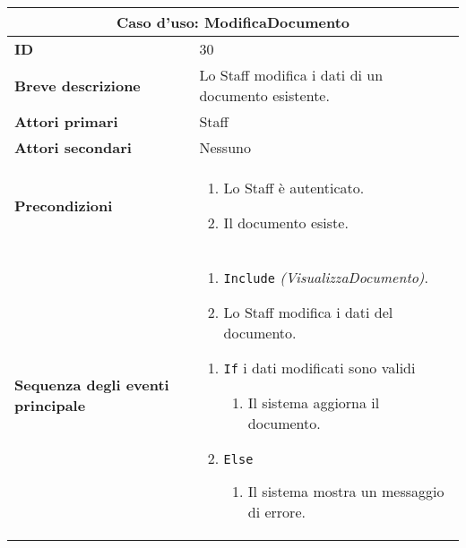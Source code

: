 \documentclass[a4paper]{report}
\begin{document}
\clearpage
\begin{table}[H]
\vspace*{-0cm}
\renewcommand{\arraystretch}{1.9}
\begin{tabular}{|p{3.9cm}|p{9.9cm}|}
\hline
\multicolumn{2}{|c|}{\textbf{Caso d’uso: ModificaDocumento}} \\ \hline
	\textbf{ID} & 30 \\ \hline
	\textbf{Breve descrizione} & Lo Staff modifica i dati di un documento esistente. \\ \hline
	\textbf{Attori primari} & Staff \\ \hline
	\textbf{Attori secondari} & Nessuno \\ \hline
	\textbf{Precondizioni} & \begin{enumerate}[leftmargin=14pt,label=\arabic*.,labelsep=0.5em,topsep=0pt,partopsep=0pt,parsep=0pt,itemsep=0pt]
        \item Lo Staff è autenticato. 
        \item Il documento esiste.
    \end{enumerate} \\ \hline
	\textbf{Sequenza degli eventi principale} & 
    \begin{enumerate}[leftmargin=14pt,label=\arabic*.,labelsep=0.5em,topsep=0pt,partopsep=0pt,parsep=0pt,itemsep=0pt]
        \item \texttt{Include} \textit{(VisualizzaDocumento)}. 
        \item Lo Staff modifica i dati del documento.
    \end{enumerate}
\begin{enumerate}[leftmargin=14pt,label=\arabic*.,labelsep=0.5em,topsep=0pt,partopsep=0pt,parsep=0pt,itemsep=0pt]
    \item \texttt{If} i dati modificati sono validi
    \begin{enumerate}[label=\arabic{enumi}.\arabic*.,leftmargin=22pt,labelsep=0.5em,topsep=0pt,partopsep=0pt,parsep=0pt,itemsep=0pt]
        \item Il sistema aggiorna il documento.
    \end{enumerate}
    \item \texttt{Else}
    \begin{enumerate}[label=\arabic{enumi}.\arabic*.,leftmargin=22pt,labelsep=0.5em,topsep=0pt,partopsep=0pt,parsep=0pt,itemsep=0pt]
        \item Il sistema mostra un messaggio di errore.
    \end{enumerate}
\end{enumerate}\\ \hline

\end{tabular}
\end{table}
\end{document}
